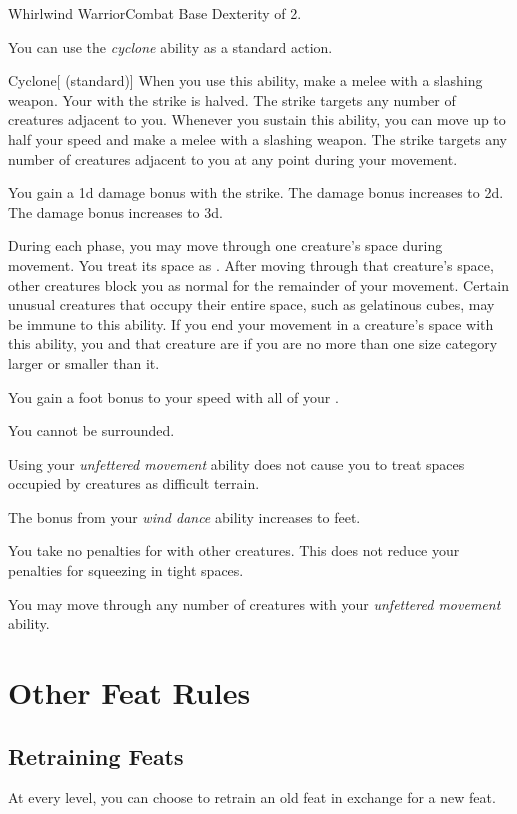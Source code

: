     \begin{feat}{Whirlwind Warrior}{Combat}
        \featpre Base Dexterity of 2.

         You can use the \textit{cyclone} ability as a standard action.
        \begin{freeability}{Cyclone}[ (standard)]
            When you use this ability, make a melee  with a slashing weapon.
            Your  with the strike is halved.
            The strike targets any number of creatures adjacent to you.
            Whenever you sustain this ability, you can move up to half your speed and make a melee  with a slashing weapon.
            The strike targets any number of creatures adjacent to you at any point during your movement.

            \rankline
             You gain a \plus1d damage bonus with the strike.
             The damage bonus increases to \plus2d.
             The damage bonus increases to \plus3d.
        \end{freeability}

         During each phase, you may move through one creature's space during movement.
        You treat its space as .
        After moving through that creature's space, other creatures block you as normal for the remainder of your movement.
        Certain unusual creatures that occupy their entire space, such as gelatinous cubes, may be immune to this ability.
        If you end your movement in a creature's space with this ability, you and that creature are  if you are no more than one size category larger or smaller than it.

         You gain a  foot bonus to your speed with all of your .

         You cannot be surrounded.

         Using your \textit{unfettered movement} ability does not cause you to treat spaces occupied by creatures as difficult terrain.

         The bonus from your \textit{wind dance} ability increases to  feet.

         You take no penalties for  with other creatures.
        This does not reduce your penalties for squeezing in tight spaces.

         You may move through any number of creatures with your \textit{unfettered movement} ability.
    \end{feat}

\section{Other Feat Rules}

    \subsection{Retraining Feats}
        At every level, you can choose to retrain an old feat in exchange for a new feat.
